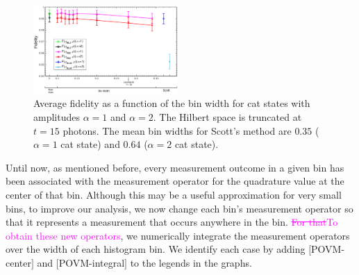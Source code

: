 \documentclass[
reprint,
superscriptaddress,
showpacs,
amsmath,
amssymb,
aps,
pra,
longbibliography
]{revtex4-1}
\providecommand{\aucmnt}[1]{#1}
\providecommand{\editcolor}[2]{\textcolor{#1}{#2}}
\providecommand{\aucmnt}[1]{}
\providecommand{\editcolor}[2]{#2}
\newcommand{\SG}[1]{\editcolor{magenta}{#1}}
\newcommand{\SGs}[1]{\aucmnt{\editcolor{magenta}{\sout{#1}}}}
\begin{document}
\begin{figure}
  \includegraphics[width=0.49\textwidth]{catstate-alpha=1and2-15photons.eps}
  \caption{Average fidelity as a function of the bin width for cat
    states with amplitudes $\alpha=1$ and $\alpha=2$. The Hilbert
    space is truncated at $t=15$ photons. The mean bin widths for
    Scott's method are $0.35$ ($\alpha=1$ cat state) and $0.64$
    ($\alpha=2$ cat state).}
  \label{fig-fidelity_vs_binwidth_15_photons_catstate}
\end{figure}




Until now, as mentioned before, every measurement outcome in a given
bin has been associated with the measurement operator for the
quadrature value at the center of that bin. Although this may be a
useful approximation for very small bins, to improve our analysis, we
now change each bin's measurement operator so that it represents a
measurement that occurs anywhere in the bin. \SGs{For that}\SG{To
  obtain these new operators}, we numerically integrate the
measurement operators over the width of each histogram bin. We
identify each case by adding $[$POVM-center$]$ and $[$POVM-integral$]$
to the legends in the graphs.
\end{document}

